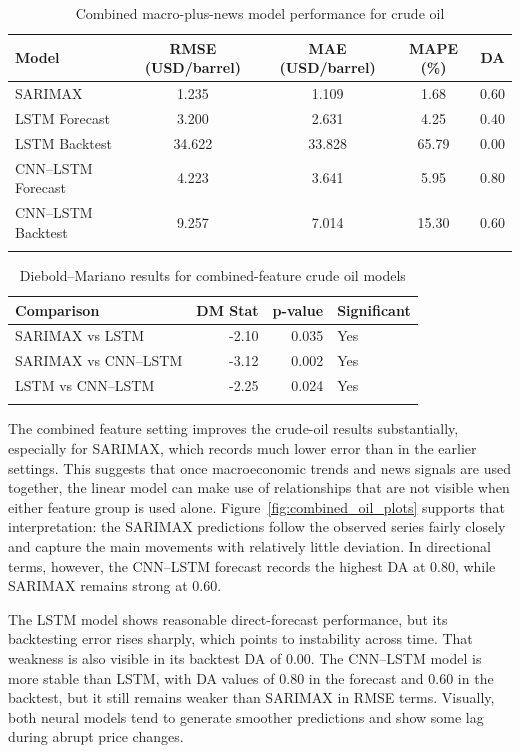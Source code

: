 \documentclass[pdflatex,sn-mathphys-num]{sn-jnl}%
\theoremstyle{thmstyleone}%
\theoremstyle{thmstyletwo}%
\theoremstyle{thmstylethree}%
\begin{document}
\begin{table}[h]
\centering
\caption{Combined macro-plus-news model performance for crude oil}
\label{tab:combined_oil}
\begin{tabular}{@{}lcccc@{}}
\toprule
Model & RMSE (USD/barrel) & MAE (USD/barrel) & MAPE (\%) & DA \\
\midrule
SARIMAX & 1.235 & 1.109 & 1.68 & 0.60 \\
LSTM Forecast & 3.200 & 2.631 & 4.25 & 0.40 \\
LSTM Backtest & 34.622 & 33.828 & 65.79 & 0.00 \\
CNN--LSTM Forecast & 4.223 & 3.641 & 5.95 & 0.80 \\
CNN--LSTM Backtest & 9.257 & 7.014 & 15.30 & 0.60 \\
\botrule
\end{tabular}
\end{table}

\begin{table}[h]
\centering
\small
\caption{Diebold--Mariano results for combined-feature crude oil models}
\label{tab:dm_combined_oil}
\begin{tabular}{@{}lrrl@{}}
\toprule
Comparison & DM Stat & p-value & Significant \\
\midrule
SARIMAX vs LSTM & -2.10 & 0.035 & Yes \\
SARIMAX vs CNN--LSTM & -3.12 & 0.002 & Yes \\
LSTM vs CNN--LSTM & -2.25 & 0.024 & Yes \\
\botrule
\end{tabular}
\end{table}

The combined feature setting improves the crude-oil results substantially, especially for SARIMAX, which records much lower error than in the earlier settings. This suggests that once macroeconomic trends and news signals are used together, the linear model can make use of relationships that are not visible when either feature group is used alone. Figure~\ref{fig:combined_oil_plots} supports that interpretation: the SARIMAX predictions follow the observed series fairly closely and capture the main movements with relatively little deviation. In directional terms, however, the CNN--LSTM forecast records the highest DA at 0.80, while SARIMAX remains strong at 0.60.

The LSTM model shows reasonable direct-forecast performance, but its backtesting error rises sharply, which points to instability across time. That weakness is also visible in its backtest DA of 0.00. The CNN--LSTM model is more stable than LSTM, with DA values of 0.80 in the forecast and 0.60 in the backtest, but it still remains weaker than SARIMAX in RMSE terms. Visually, both neural models tend to generate smoother predictions and show some lag during abrupt price changes.
\end{document}
